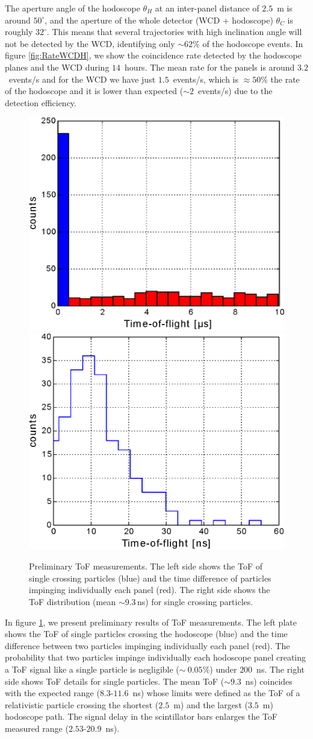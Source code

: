 \documentclass[letterpaper,11pt]{article}
\begin{document}
The aperture angle of the hodoscope $\theta_H$ at an inter-panel distance of $2.5$~m is around $50^{\circ}$, and the aperture of the whole detector (WCD + hodoscope) $\theta_C$ is roughly $32^{\circ}$. This means that several trajectories with high inclination angle will not be detected by the WCD, identifying only $\sim 62\%$ of the hodoscope events. In figure \ref{fig:RateWCDH}, we show the coincidence rate detected by the hodoscope planes and the WCD during $14$~hours. The mean rate for the panels is around $3.2$~events/s and for the WCD we have just $1.5$~events/s, which is  $\approx 50\%$ the rate of the hodoscope and it is lower than expected ($\sim 2$~events/s) due to the detection efficiency.

\begin{figure}[htb]
\centering
\includegraphics[width=0.48\columnwidth]{Figures/signal_back.eps}
\includegraphics[width=0.48\columnwidth]{Figures/ToF.eps}
\caption{Preliminary ToF measurements. The left side shows the ToF of single crossing particles (blue) and the time difference of particles impinging individually each panel (red). The right side shows the ToF distribution (mean $\sim$9.3\,ns) for single crossing particles.}
\label{fig:ToF}
\end{figure}

In figure \ref{fig:ToF}, we present preliminary results of ToF measurements. The left plate shows the ToF of single particles crossing the hodoscope (blue) and the time difference between two particles impinging individually each panel (red). The probability that two particles impinge individually each hodoscope panel creating a ToF signal like a single particle is negligible ($\sim~0.05\%$) under $200$~ns. The right side shows ToF details for single particles. The mean ToF ($\sim9.3$~ns) coincides with the expected range ($8.3$-$11.6$~ns) whose limits were defined as the ToF of a relativistic particle crossing the shortest ($2.5$~m) and the largest ($3.5$~m) hodoscope path. The signal delay in the scintillator bars enlarges the ToF measured range ($2.53$-$20.9$~ns).
\end{document}

